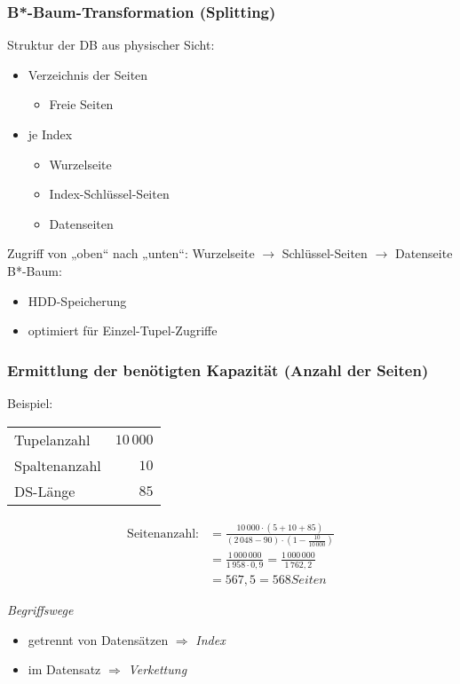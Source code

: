 \subsubsection{B*-Baum-Transformation (Splitting)}

Struktur der DB aus physischer Sicht:
\begin{itemize}
\item Verzeichnis der Seiten
\begin{itemize}
\item Freie Seiten
\end{itemize}
\item je Index
\begin{itemize}
\item Wurzelseite
\item Index-Schlüssel-Seiten
\item Datenseiten
\end{itemize}
\end{itemize}
Zugriff von „oben“ nach „unten“: Wurzelseite $\to$ Schlüssel-Seiten $\to$ Datenseite\bigskip\\
B*-Baum:
\begin{itemize}
\item HDD-Speicherung
\item optimiert für Einzel-Tupel-Zugriffe
\end{itemize}
\subsubsection{Ermittlung der benötigten Kapazität (Anzahl der Seiten)}
Beispiel:\\
\begin{tabular}{l r}
Tupelanzahl & $10\,000$\\
Spaltenanzahl & $10$\\
DS-Länge & $85$
\end{tabular}
\begin{align*}
\text{Seitenanzahl:}&=\frac{10\,000 \cdot (5+10+85)}{(2\,048-90)\cdot \left(1-\frac{10}{10\,000}\right)}\\
&= \frac{1\,000\,000}{1\,958\cdot 0,9}= \frac{1\,000\,000}{1\,762,2}\\
&=567,5 = 568 \unit{Seiten}
\end{align*}

\emph{Begriffswege}
\begin{itemize}
    \item getrennt von Datensätzen $\Rightarrow$ \emph{Index}
    \item im Datensatz $\Rightarrow$ \emph{Verkettung}
\end{itemize}


